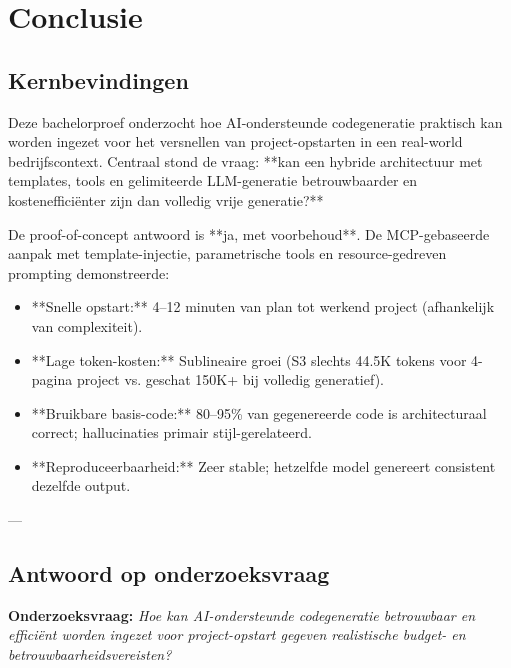 
\chapter{Conclusie}

\section{Kernbevindingen}

Deze bachelorproef onderzocht hoe AI-ondersteunde codegeneratie praktisch kan worden ingezet voor het versnellen van project-opstarten in een real-world bedrijfscontext. Centraal stond de vraag: **kan een hybride architectuur met templates, tools en gelimiteerde LLM-generatie betrouwbaarder en kostenefficiënter zijn dan volledig vrije generatie?**

De proof-of-concept antwoord is **ja, met voorbehoud**. De MCP-gebaseerde aanpak met template-injectie, parametrische tools en resource-gedreven prompting demonstreerde:

\begin{itemize}
  \item **Snelle opstart:** 4–12 minuten van plan tot werkend project (afhankelijk van complexiteit).
  
  \item **Lage token-kosten:** Sublineaire groei (S3 slechts 44.5K tokens voor 4-pagina project vs. geschat 150K+ bij volledig generatief).
  
  \item **Bruikbare basis-code:** 80–95\% van gegenereerde code is architecturaal correct; hallucinaties primair stijl-gerelateerd.
  
  \item **Reproduceerbaarheid:** Zeer stable; hetzelfde model genereert consistent dezelfde output.
\end{itemize}

---

\section{Antwoord op onderzoeksvraag}

\noindent
\textbf{Onderzoeksvraag:} \textit{Hoe kan AI-ondersteunde codegeneratie betrouwbaar en efficiënt worden ingezet voor project-opstart gegeven realistische budget- en betrouwbaarheidsvereisten?}

